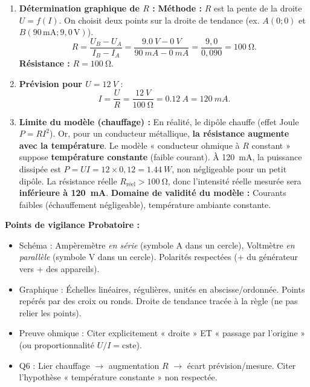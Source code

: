 \documentclass[11pt]{article}
\begin{document}
\begin{corrige}
\begin{enumerate}
\begin{itemize}
      \item Le rapport $U/I$ est constant : $\frac{1,5}{15} = \frac{3,0}{30} = \dots = \frac{9,0}{90} = \SI{0,1}{V/mA} = \SI{100}{V/A}$.
      \end{itemize}
      Le dipôle $D$ est un \textbf{conducteur ohmique}. La loi mathématique est : $\boxed{U = R\,I}$ avec $R = \SI{100}{\ohm}$.
\item \textbf{Détermination graphique de $R$ :}
      \textbf{Méthode :} $R$ est la pente de la droite $U=f(I)$.
      On choisit deux points sur la droite de tendance (ex. $A(0;0)$ et $B(90\,\mathrm{mA}; 9,0\,\mathrm{V})$).
      \[
      R = \frac{U_B - U_A}{I_B - I_A} = \frac{\SI{9,0}{V} - \SI{0}{V}}{\SI{90}{mA} - \SI{0}{mA}} = \frac{9,0}{0,090} = \SI{100}{\ohm}.
      \]
      \textbf{Résistance :} $\boxed{R = \SI{100}{\ohm}}$.
\item \textbf{Prévision pour $U = \SI{12}{V}$} :
      \[
      I = \frac{U}{R} = \frac{\SI{12}{V}}{\SI{100}{\ohm}} = \SI{0,12}{A} = \boxed{\SI{120}{mA}}.
      \]
\item \textbf{Limite du modèle (chauffage) :}
      En réalité, le dipôle chauffe (effet Joule $P = R I^2$). Or, pour un conducteur métallique, \textbf{la résistance augmente avec la température}. Le modèle « conducteur ohmique à $R$ constant » suppose \textbf{température constante} (faible courant). À \SI{120}{mA}, la puissance dissipée est $P = U I = 12 \times 0,12 = \SI{1,44}{W}$, non négligeable pour un petit dipôle. La résistance réelle $R_{\text{réel}} > \SI{100}{\ohm}$, donc l'intensité réelle mesurée sera \textbf{inférieure à \SI{120}{mA}}.
      \textbf{Domaine de validité du modèle :} Courants faibles (échauffement négligeable), température ambiante constante.
\end{enumerate}
\textbf{Points de vigilance Probatoire :}
\begin{itemize}
\item Schéma : Ampèremètre \emph{en série} (symbole A dans un cercle), Voltmètre \emph{en parallèle} (symbole V dans un cercle). Polarités respectées (+ du générateur vers + des appareils).
\item Graphique : Échelles linéaires, régulières, unités en abscisse/ordonnée. Points repérés par des croix ou ronds. Droite de tendance tracée à la règle (ne pas relier les points).
\item Preuve ohmique : Citer explicitement « droite » ET « passage par l'origine » (ou proportionnalité $U/I = \text{cste}$).
\item Q6 : Lier chauffage $\to$ augmentation $R$ $\to$ écart prévision/mesure. Citer l'hypothèse « température constante » non respectée.
\end{itemize}
\end{corrige}
\end{document}
